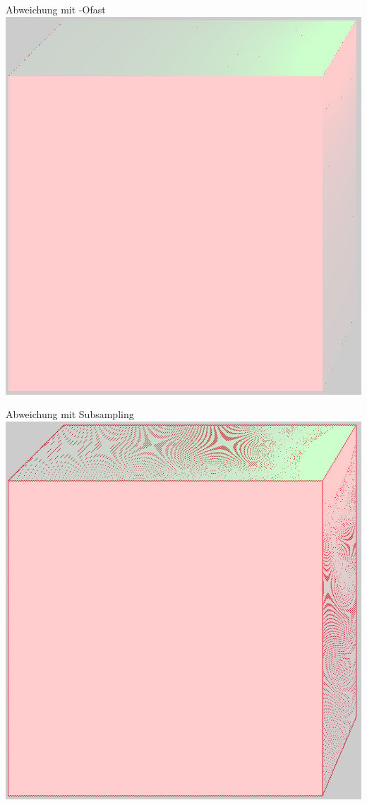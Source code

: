 	\begin{frame}{Abweichung mit -Ofast}
		\center
		\includegraphics[height=0.8\textheight]{images/cropped_diff_fast.png}
	\end{frame}
	\begin{frame}{Abweichung mit Subsampling}
		\center
		\includegraphics[height=0.8\textheight]{images/cropped_diff_ss.png}
	\end{frame}

